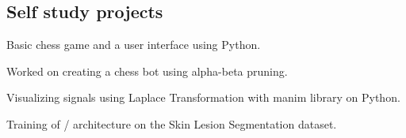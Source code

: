 \documentclass[letter, 14pt]{article}
\begin{document}
\subsection{Self study projects}
\subtext{}
\begin{zitemize}
\item Basic chess game and a user interface using Python. \href{https://github.com/denizberkin/test_chess}{\color{black}\externallink}
\item Worked on creating a chess bot using alpha-beta pruning.
\item Visualizing signals using Laplace Transformation with manim library on Python.
\item Training of \href{https://arxiv.org/pdf/1505.04597}{\color{black}{UNet}}/\href{https://arxiv.org/pdf/2201.01266}{\color{black}{SwinUnetR}} architecture on the Skin Lesion Segmentation dataset.

\end{zitemize}
\end{document}
